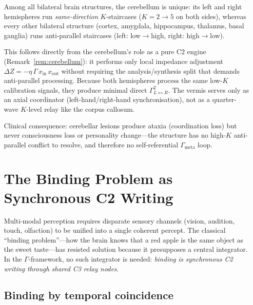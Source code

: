\documentclass[aps,pre,twocolumn,superscriptaddress,floatfix]{revtex4-2}
\begin{document}
\begin{remark}
\label{rem:cerebellum-bilateral}
Among all bilateral brain structures, the cerebellum
is unique: its left and right hemispheres run
\emph{same-direction} $K$-staircases
($K = 2 \to 5$ on both sides), whereas every other
bilateral structure (cortex, amygdala, hippocampus,
thalamus, basal ganglia) runs anti-parallel staircases
(left: low$\to$high, right: high$\to$low).

This follows directly from the cerebellum's role as a
pure C2 engine (Remark~\ref{rem:cerebellum}):
it performs only local impedance adjustment
$\Delta Z = -\eta\,\Gamma\,x_{\text{in}}\,x_{\text{out}}$
without requiring the analysis/synthesis split that
demands anti-parallel processing.
Because both hemispheres process the same low-$K$
calibration signals, they produce minimal
direct $\Gamma^2_{L \leftrightarrow R}$.
The vermis serves only as an axial coordinator
(left-hand/right-hand synchronisation),
not as a quarter-wave $K$-level relay like the
corpus callosum.

Clinical consequence: cerebellar lesions produce
ataxia (coordination loss) but never consciousness
loss or personality change---the structure has no
high-$K$ anti-parallel conflict to resolve, and
therefore no self-referential $\Gamma_{\text{meta}}$
loop.
\end{remark}


\section{The Binding Problem as Synchronous C2 Writing}
\label{sec:binding}

Multi-modal perception requires disparate sensory
channels (vision, audition, touch, olfaction) to be
unified into a single coherent percept.
The classical ``binding problem''---how the brain
knows that a red apple is the same object as the
sweet taste---has resisted solution because it
presupposes a central integrator.
In the $\Gamma$-framework, no such integrator is needed:
\emph{binding is synchronous C2 writing through shared
C3 relay nodes}.

\subsection{Binding by temporal coincidence}
\label{sec:binding-mechanism}
\end{document}
